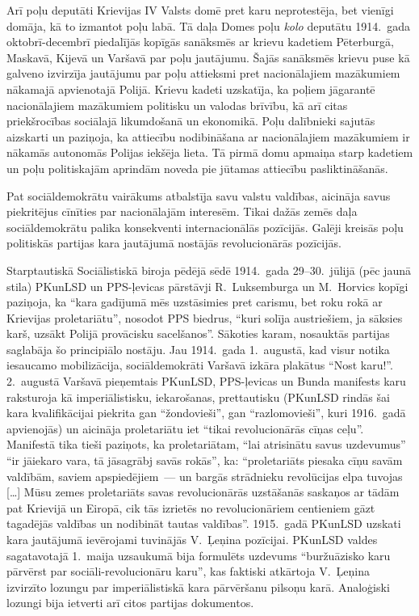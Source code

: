 \documentclass[twoside,a5paper,12pt,fleqn,openany]{extbook}
\newcommand{\pltxti}[1]{\textit{\textpolish{#1}}}
\newcommand{\citespace}{[\dots{}]}
\begin{document}
Arī poļu deputāti Krievijas IV Valsts domē pret karu neprotestēja, bet vienīgi domāja, kā to izmantot poļu labā. Tā daļa Domes poļu \pltxti{kolo} deputātu 1914.~gada oktobrī-decembrī piedalījās kopīgās sanāksmēs ar krievu kadetiem Pēterburgā, Maskavā, Kijevā un Varšavā par poļu jautājumu. Šajās sanāksmēs krievu puse kā galveno izvirzīja jautājumu par poļu attieksmi pret nacionālajiem mazākumiem nākamajā apvienotajā Polijā. Krievu kadeti uzskatīja, ka poļiem jāgarantē nacionālajiem mazākumiem politisku un valodas brīvību, kā arī citas priekšrocības sociālajā likumdošanā un ekonomikā. Poļu dalībnieki sajutās aizskarti un paziņoja, ka attiecību nodibināšana ar nacionālajiem mazākumiem ir nākamās autonomās Polijas iekšēja lieta. Tā pirmā domu apmaiņa starp kadetiem un poļu politiskajām aprindām noveda pie jūtamas attiecību pasliktināšanās.

Pat sociāldemokrātu vairākums atbalstīja savu valstu valdības, aicināja savus piekritējus cīnīties par nacionālajām interesēm. Tikai dažās zemēs daļa sociāldemokrātu palika konsekventi internacionālās pozīcijās. Galēji kreisās poļu politiskās partijas kara jautājumā nostājās revolucionārās pozīcijās.

Starptautiskā Sociālistiskā biroja pēdējā sēdē 1914.~gada 29--30.~jūlijā (pēc jaunā stila) PKunLSD un PPS-ļevicas pārstāvji R.~Luksemburga un M.~Horvics kopīgi paziņoja, ka ``kara gadījumā mēs uzstāsimies pret carismu, bet roku rokā ar Krievijas proletariātu'', nosodot PPS biedrus, ``kuri solīja austriešiem, ja sāksies karš, uzsākt Polijā provācisku sacelšanos''. Sākoties karam, nosauktās partijas saglabāja šo principiālo nostāju. Jau 1914.~gada 1.~augustā, kad visur notika iesaucamo mobilizācija, sociāldemokrāti Varšavā izkāra plakātus ``Nost karu!''. 2.~augustā Varšavā pieņemtais PKunLSD, PPS-ļevicas un Bunda manifests karu raksturoja kā imperiālistisku, iekarošanas, prettautisku (PKunLSD rindās šai kara kvalifikācijai piekrita gan ``žondovieši'', gan ``razlomovieši'', kuri 1916.~gadā apvienojās) un aicināja proletariātu iet ``tikai revolucionārās cīņas ceļu''. Manifestā tika tieši paziņots, ka proletariātam, ``lai atrisinātu savus uzdevumus'' ``ir jāiekaro vara, tā jāsagrābj savās rokās'', ka: ``proletariāts piesaka cīņu savām valdībām, saviem apspiedējiem~--- un bargās strādnieku revolūcijas elpa tuvojas \citespace{} Mūsu zemes proletariāts savas revolucionārās uzstāšanās saskaņos ar tādām pat Krievijā un Eiropā, cik tās izrietēs no revolucionāriem centieniem gāzt tagadējās valdības un nodibināt tautas valdības''. 1915.~gadā PKunLSD uzskati kara jautājumā ievērojami tuvinājās V.~Ļeņina pozīcijai. PKunLSD valdes sagatavotajā 1.~maija uzsaukumā bija formulēts uzdevums ``buržuāzisko karu pārvērst par sociāli-revolucionāru karu'', kas faktiski atkārtoja V.~Ļeņina izvirzīto lozungu par imperiālistiskā kara pārvēršanu pilsoņu karā. Analoģiski lozungi bija ietverti arī citos partijas dokumentos.
\end{document}
